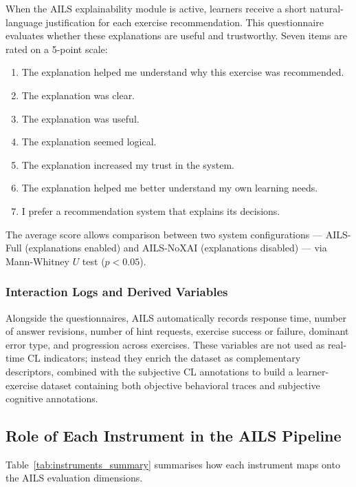 \documentclass[ASNA,twocolumn]{USG} %
\begin{document}
When the AILS explainability module is active, learners receive a
short natural-language justification for each exercise recommendation.
This questionnaire evaluates whether these explanations are useful
and trustworthy. Seven items are rated on a 5-point scale:
\begin{enumerate}
  \item The explanation helped me understand why this exercise was
        recommended.
  \item The explanation was clear.
  \item The explanation was useful.
  \item The explanation seemed logical.
  \item The explanation increased my trust in the system.
  \item The explanation helped me better understand my own learning
        needs.
  \item I prefer a recommendation system that explains its decisions.
\end{enumerate}
The average score allows comparison between two system configurations
--- AILS-Full (explanations enabled) and AILS-NoXAI (explanations
disabled) --- via Mann-Whitney $U$ test ($p < 0.05$).

\subsubsection{Interaction Logs and Derived Variables}

Alongside the questionnaires, AILS automatically records response
time, number of answer revisions, number of hint requests, exercise
success or failure, dominant error type, and progression across
exercises. These variables are not used as real-time CL indicators;
instead they enrich the dataset as complementary descriptors,
combined with the subjective CL annotations to build a
learner-exercise dataset containing both objective behavioral traces
and subjective cognitive annotations.

\subsection{Role of Each Instrument in the AILS Pipeline}

Table~\ref{tab:instruments_summary} summarises how each instrument
maps onto the AILS evaluation dimensions.

\end{document}
